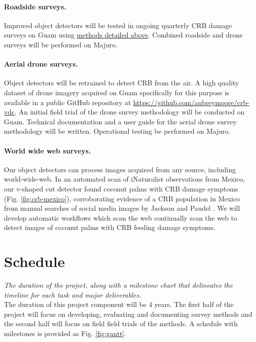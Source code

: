 \documentclass[11pt,english,letterpaper]{scrartcl}
\begin{document}
\paragraph{Roadside surveys.} Improved object detectors will be tested in ongoing quarterly CRB damage surveys on Guam using \hyperref[previous_work]{methods detailed above}. Combined roadside and drone surveys will be performed on Majuro. 

\paragraph{Aerial drone surveys.} Object detectors will be retrained to detect CRB from the air. A high quality dataset of drone imagery acquired on Guam specifically for this purpose is available in a public GitHub repository at \url{https://github.com/aubreymoore/crb-vdc}. An initial field trial of the drone survey methodology will be conducted on Guam. Technical documentation and a user guide for the aerial drone survey methodology will be written. Operational testing be performed on Majuro.

\paragraph{World wide web surveys.}

Our object detectors can process images acquired from any source, including world-wide-web. In an automated scan of iNaturalist observations from Mexico, our v-shaped cut detector found coconut palms with CRB damage symptoms (Fig. \ref{fig:crb-mexico}), corroborating evidence of a CRB population in Mexico from manual searches of social media images by Jackson and Paudel \cite{Jackson2022}. We will develop automatic workflows which scan the web continually scan the web to detect images of coconut palms with CRB feeding damage symptoms.

\clearpage
\section{Schedule}

\textit{The duration of the project, along with a milestone chart that delineates the timeline for each task and major deliverables.} \\

The duration of this project component will be 4 years. The first half of the project will focus on developing, evaluating and documenting survey methods and the second half will focus on field field trials of the methods. A schedule with milestones is provided as Fig. \ref{fig:gantt}.
\end{document}
